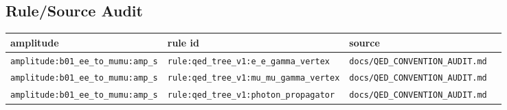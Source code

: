 \documentclass[11pt]{article}
\begin{document}
\subsection*{Rule/Source Audit}
\begin{longtable}{p{0.24\linewidth}p{0.22\linewidth}p{0.38\linewidth}}
\toprule
amplitude & rule id & source \\
\midrule
\texttt{amplitude:b01\_ee\_to\_mumu:amp\_s} & \texttt{rule:qed\_tree\_v1:e\_e\_gamma\_vertex} & \texttt{docs/QED\_CONVENTION\_AUDIT.md} \\
\texttt{amplitude:b01\_ee\_to\_mumu:amp\_s} & \texttt{rule:qed\_tree\_v1:mu\_mu\_gamma\_vertex} & \texttt{docs/QED\_CONVENTION\_AUDIT.md} \\
\texttt{amplitude:b01\_ee\_to\_mumu:amp\_s} & \texttt{rule:qed\_tree\_v1:photon\_propagator} & \texttt{docs/QED\_CONVENTION\_AUDIT.md} \\
\bottomrule
\end{longtable}
\end{document}
